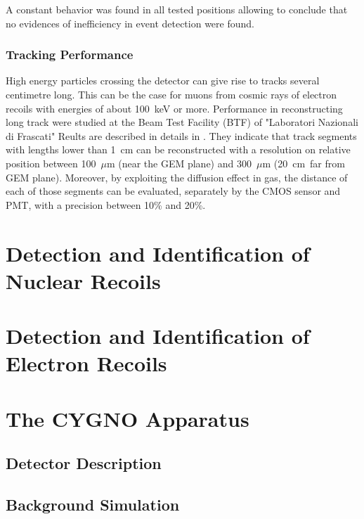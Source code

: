 \documentclass[physics,article,submit,moreauthors,pdftex]{Definitions/mdpi}
\begin{document}
A constant behavior was found in all tested positions allowing to conclude that no evidences of inefficiency in event detection were found.

\subsubsection{Tracking Performance}

High energy particles crossing the detector can give rise to tracks several
centimetre long.
This can be the case for muons from cosmic rays of electron recoils with energies of about 100~keV or more. 
Performance in reconstructing long track were studied at the Beam Test Facility (BTF) of "Laboratori Nazionali di Frascati" \cite{bib:btf1,bib:btf2}
Reults are described in details in \cite{bib:ieee17, bib:ieee18, bib:lemon_btf}. They indicate that track segments with lengths lower than 1~cm can be reconstructed with a resolution on relative position between 100~$\mu$m (near the GEM plane) and 300~$\mu$m (20~cm~far from GEM plane).
Moreover, by exploiting the diffusion effect in gas, the distance of each of those segments can be evaluated, separately by the CMOS sensor and PMT, with a precision between 10\% and 20\%.

\section{Detection and Identification of Nuclear Recoils}



\section{Detection and Identification of Electron Recoils}

\section{The CYGNO Apparatus}

\subsection{Detector Description}
\subsection{Background Simulation}
\end{document}
